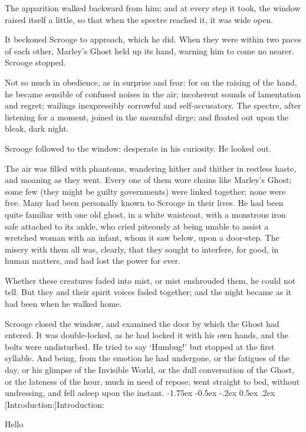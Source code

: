\documentclass[11pt,twoside]{article}\makeatletter
\makeatletter
\renewcommand\section{\@startsection {section}{1}{\z@}%
     {-1.75ex \@plus -0.5ex \@minus -.2ex}%
     {0.5ex \@plus .2ex}%
     {\reset@font\Large\bfseries\sffamily}}
\renewcommand\subsection{\@startsection{subsection}{2}{\z@}%
     {-1.75ex\@plus -0.5ex \@minus- .2ex}%
     {0.5ex \@plus .2ex}%
     {\reset@font\Large\sffamily}}
\def\DivII{\subsection}
\def\DivII{\section}
\makeatother
\begin{document}
The apparition walked backward from him; and at every step it took, the window raised itself a little, so that when the spectre reached it, it was wide open.  \par
It beckoned Scrooge to approach, which he did.  When they were within two paces of each other, Marley's Ghost held up its hand, warning him to come no nearer.  Scrooge stopped.  \par
Not so much in obedience, as in surprise and fear: for on the raising of the hand, he became sensible of confused noises in the air; incoherent sounds of lamentation and regret; wailings inexpressibly sorrowful and self-accusatory.  The spectre, after listening for a moment, joined in the mournful dirge; and floated out upon the bleak, dark night.   \par
Scrooge followed to the window: desperate in his curiosity.  He looked out.  \par
The air was filled with phantoms, wandering hither and thither in restless haste, and moaning as they went. Every one of them wore chains like Marley's Ghost; some few (they might be guilty governments) were linked together; none were free. Many had been personally known to Scrooge in their lives. He had been quite familiar with one old ghost, in a white waistcoat, with a monstrous iron safe attached to its ankle, who cried piteously at being unable to assist a wretched woman with an  infant, whom it saw below, upon a door-step. The misery with them all was, clearly, that they sought to interfere, for good, in human matters, and had lost the power for ever.    \par
Whether these creatures faded into mist, or mist enshrouded them, he could not tell.  But they and their spirit voices faded together; and the night became as it had been when he walked home.  \par
Scrooge closed the window, and examined the door by which the Ghost had entered.  It was double-locked, as he had locked it with his own hands, and the bolts were undisturbed. He tried to say ‘Humbug!’ but stopped at the first syllable.  And being, from the emotion he had undergone, or the fatigues of the day, or his glimpse of the Invisible World, or the dull conversation of the Ghost, or the lateness of the hour, much in need of repose; went straight to bed, without undressing, and fell asleep upon the instant. 
\DivII[Introduction:]{Introduction:}\label{introduction}\par
Hello\par
\end{document}
